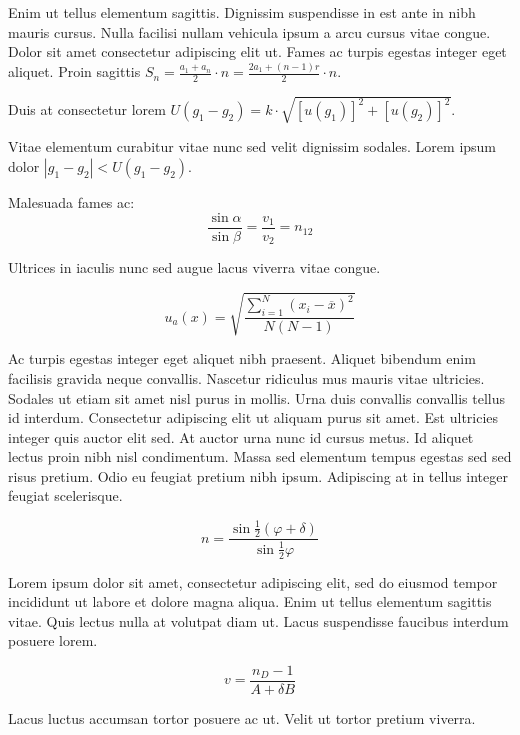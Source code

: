\documentclass{article}
\begin{document}
Enim ut tellus elementum sagittis. Dignissim suspendisse in est ante in nibh mauris cursus. Nulla facilisi nullam vehicula ipsum a arcu cursus vitae congue. Dolor sit amet consectetur adipiscing elit ut. Fames ac turpis egestas integer eget aliquet. Proin sagittis \begin{math}
	S_{n}=\frac{a_{1}+a_{n}}{2}\cdot n=\frac{2a_{1}+(n-1)r}{2}\cdot n
\end{math}.\newline

Duis at consectetur lorem $ U(g_1-g_2)=k\cdot \sqrt{[u(g_1)]^2+[u(g_2)]^2} $.\newline

Vitae elementum curabitur vitae nunc sed velit dignissim sodales. Lorem ipsum dolor \( |g_1-g_2|<U(g_1-g_2) \).\newline

Malesuada fames ac: \[ \frac{\sin \alpha}{\sin \beta}=\frac{v_1}{v_2}=n_{12} \]

Ultrices in iaculis nunc sed augue lacus viverra vitae congue.

$$ u_a(x)=\sqrt{\frac{\sum_{i=1}^{N} (x_i-\overline{x})^2}{N(N-1)}} $$

Ac turpis egestas integer eget aliquet nibh praesent. Aliquet bibendum enim facilisis gravida neque convallis. Nascetur ridiculus mus mauris vitae ultricies. Sodales ut etiam sit amet nisl purus in mollis. Urna duis convallis convallis tellus id interdum. Consectetur adipiscing elit ut aliquam purus sit amet. Est ultricies integer quis auctor elit sed. At auctor urna nunc id cursus metus. Id aliquet lectus proin nibh nisl condimentum. Massa sed elementum tempus egestas sed sed risus pretium. Odio eu feugiat pretium nibh ipsum. Adipiscing at in tellus integer feugiat scelerisque.

\begin{displaymath}
	n=\frac{\sin \frac{1}{2}(\varphi +\delta)}{\sin \frac{1}{2}\varphi}
\end{displaymath}

Lorem ipsum dolor sit amet, consectetur adipiscing elit, sed do eiusmod tempor incididunt ut labore et dolore magna aliqua. Enim ut tellus elementum sagittis vitae. Quis lectus nulla at volutpat diam ut. Lacus suspendisse faucibus interdum posuere lorem. 

\begin{equation}
	v=\frac{n_D-1}{A+\delta B}
\end{equation}

Lacus luctus accumsan tortor posuere ac ut. Velit ut tortor pretium viverra.
\end{document}
